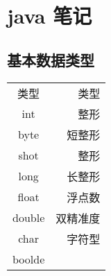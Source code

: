 \documentclass[11pt]{article}
\author{aero}
\date{\today}
\title{}
\begin{document}
\tableofcontents

\section{java 笔记}
\label{sec:org8b7b832}
\subsection{基本数据类型}
\label{sec:orgbd96cf9}

\begin{center}
\begin{tabular}{cr}
\hline
类型 & 类型\\
int & 整形\\
byte & 短整形\\
shot & 整形\\
long & 长整形\\
\hline
float & 浮点数\\
double & 双精准度\\
\hline
char & 字符型\\
\hline
boolde & \\
\hline
\end{tabular}
\end{center}
\end{document}
